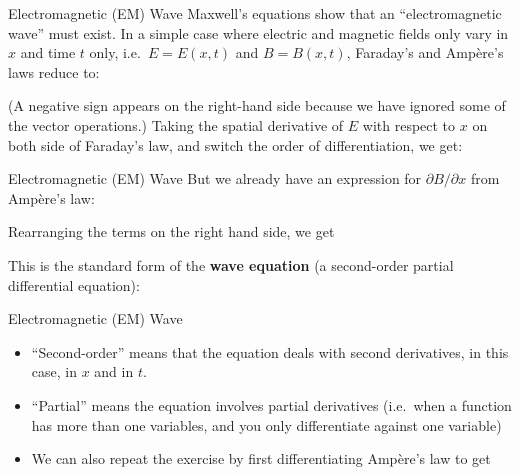 \documentclass[12pt,aspectratio=169]{beamer}
\begin{document}
\begin{frame}{Electromagnetic (EM) Wave}
  Maxwell's equations show that an ``electromagnetic wave'' must exist. In a
  simple case where electric and magnetic fields only vary in $x$ and time $t$
  only, i.e.\ $E=E(x,t)$ and $B=B(x,t)$, Faraday's and Amp\`{e}re's laws reduce
  to:


  (A negative sign appears on the right-hand side because we have ignored some
  of the vector operations.) Taking the spatial derivative of $E$ with respect
  to $x$ on both side of Faraday's law, and switch the order of
  differentiation, we get:

\end{frame}



\begin{frame}{Electromagnetic (EM) Wave}
  But we already have an expression for $\partial B/\partial x$ from
  Amp\`{e}re's law:


  Rearranging the terms on the right hand side, we get

  
  This is the standard form of the \textbf{wave equation} (a second-order
  partial differential equation):

\end{frame}



\begin{frame}{Electromagnetic (EM) Wave}
  \begin{itemize}
  \item ``Second-order'' means that the equation deals with second derivatives,
    in this case, in $x$ and in $t$.
  \item ``Partial'' means the equation involves partial derivatives (i.e.\
    when a function has more than one variables, and you only differentiate
    against one variable)
  \item We can also repeat the exercise by first differentiating Amp\`{e}re's
    law to get

  \end{itemize}
\end{frame}
\end{document}
